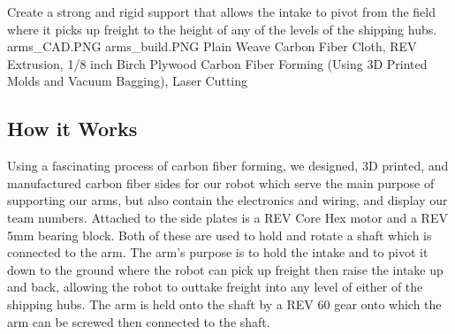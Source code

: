 {Create a strong and rigid support that allows the intake to pivot from the field where it picks up freight to the height of any of the levels of the shipping hubs.} %
{arms_CAD.PNG}%
{arms_build.PNG}%
{Plain Weave Carbon Fiber Cloth, REV Extrusion, 1/8 inch Birch Plywood}%
{Carbon Fiber Forming (Using 3D Printed Molds and Vacuum Bagging), Laser Cutting}%



\subsection*{How it Works}
Using a fascinating process of carbon fiber forming, we designed, 3D printed, and manufactured carbon fiber sides for our robot which serve the main purpose of supporting our arms, but also contain the electronics and wiring, and display our team numbers. Attached to the side plates is a REV Core Hex motor and a REV 5mm bearing block. Both of these are used to hold and rotate a shaft which is connected to the arm. The arm’s purpose is to hold the intake and to pivot it down to the ground where the robot can pick up freight then raise the intake up and back, allowing the robot to outtake freight into any level of either of the shipping hubs. The arm is held onto the shaft by a REV 60 gear onto which the arm can be screwed then connected to the shaft.

  


